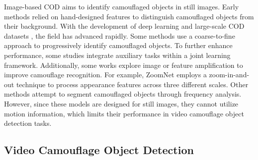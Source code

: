 Image-based COD aims to identify camouflaged objects in still images. Early methods \cite{pan2011study, liu2012foreground} relied on hand-designed features to distinguish camouflaged objects from their background. With the development of deep learning and large-scale COD datasets \cite{camo, chameleon, fan2020camouflaged}, the field has advanced rapidly. Some methods \cite{FanDP2020-Pranet, fan2020camouflaged, FanDP2021-ConcealedOD} use a coarse-to-fine approach to progressively identify camouflaged objects. To further enhance performance, some studies \cite{zhai2021MGL, Lv2021-RankNet, he2023camouflaged} integrate auxiliary tasks within a joint learning framework. Additionally, some works \cite{pang2022zoom, jia2022-CODSegMar, Xing2023-SARNet} explore image or feature amplification to improve camouflage recognition. For example, ZoomNet \cite{pang2022zoom} employs a zoom-in-and-out technique to process appearance features across three different scales. Other methods \cite{lin2023frequency, sun2025frequency, zhang2024frequency} attempt to segment camouflaged objects through frequency analysis. However, since these models are designed for still images, they cannot utilize motion information, which limits their performance in video camouflage object detection tasks.





\subsection{Video Camouflage Object Detection}


